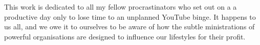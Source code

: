 \clearpage
\begin{dedication}
   This work is dedicated to all my fellow procrastinators who set out on a a productive day only to lose time to an unplanned YouTube binge. It happens to us all, and we owe it to ourselves to be aware of how the subtle ministrations of powerful organisations are designed to influence our lifestyles for their profit.
\end{dedication}